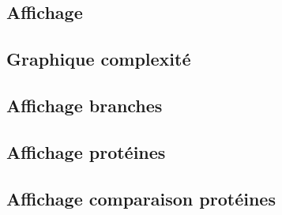 \begin{frame}
    \section{Affichage}
    \subsection{Graphique complexité}
    
    \subsection{Affichage branches}
    
    \subsection{Affichage protéines}
    
    \subsection{Affichage comparaison protéines}
    
\end{frame}




